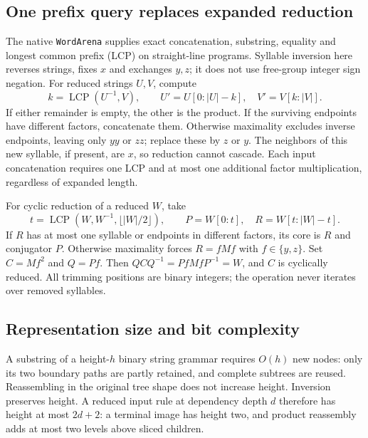 \subsection{One prefix query replaces expanded reduction}

The native \texttt{WordArena} supplies exact concatenation, substring,
equality and longest common prefix (LCP) on straight-line programs.
Syllable inversion here reverses strings, fixes $x$ and exchanges $y,z$;
it does not use free-group integer sign negation. For reduced strings $U,V$,
compute
\[
 k=\operatorname{LCP}(U^{-1},V),\qquad
 U'=U[0:|U|-k],\quad V'=V[k:|V|].
\]
If either remainder is empty, the other is the product. If the surviving
endpoints have different factors, concatenate them. Otherwise maximality
excludes inverse endpoints, leaving only $yy$ or $zz$; replace these by $z$
or $y$. The neighbors of this new syllable, if present, are $x$, so reduction
cannot cascade. Each input concatenation requires one LCP and at most one
additional factor multiplication, regardless of expanded length.

For cyclic reduction of a reduced $W$, take
\[
 t=\operatorname{LCP}(W,W^{-1},\lfloor |W|/2\rfloor),\qquad
 P=W[0:t],\quad R=W[t:|W|-t].
\]
If $R$ has at most one syllable or endpoints in different factors, its core
is $R$ and conjugator $P$. Otherwise maximality forces $R=fMf$ with
$f\in\{y,z\}$. Set $C=Mf^2$ and $Q=Pf$. Then
$QCQ^{-1}=PfMfP^{-1}=W$, and $C$ is cyclically reduced.
All trimming positions are binary integers; the operation never iterates over
removed syllables.

\subsection{Representation size and bit complexity}

A substring of a height-$h$ binary string grammar requires $O(h)$ new nodes:
only its two boundary paths are partly retained, and complete subtrees are
reused. Reassembling in the original tree shape does not increase height.
Inversion preserves height. A reduced input rule at dependency depth $d$
therefore has height at most $2d+2$: a terminal image has height two, and
product reassembly adds at most two levels above sliced children.

